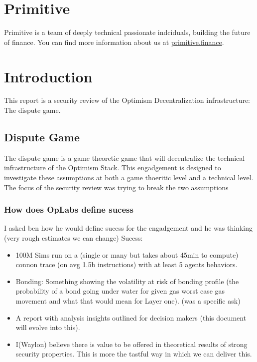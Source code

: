 \section{Primitive}\label{primitive}

Primitive is a team of deeply technical passionate indciduals, building
the future of finance.
You can find more information about us at \href{https://primitive.finance}{primitive.finance}.

\section{Introduction}\label{introduction}

This report is a security review of the Optimism Decentralization infrastructure: The dispute game.

\subsection{Dispute Game}\label{dispute-game}

The dispute game is a game theoretic game that will decentralize the technical infrastructure of the Optimism Stack.
This engadgement is designed to investigate these assumptions at both a game thoeritic level and a technical level.
The focus of the security review was trying to break the two assumptions

\subsubsection{How does OpLabs define sucess}
I asked ben how he would define sucess for the engadgement and he was thinking (very rough estimates we can change)
Sucess: 

\begin{itemize}
  \item 100M Sims run on a (single or many but takes about 45min to compute) connon trace (on avg 1.5b instructions) with at least 5 agents behaviors.
  \item Bonding: Something showing the volatility at risk of bonding profile (the probability of a bond going under water for given gas worst case gas movement and what that would mean for Layer one). (was a specific ask)
  \item A report with analysis insights outlined for decision makers (this document will evolve into this).
  \item I(Waylon) believe there is value to be offered in theoretical results of strong security properties. This is more the tastful way in which we can deliver this.
\end{itemize}

